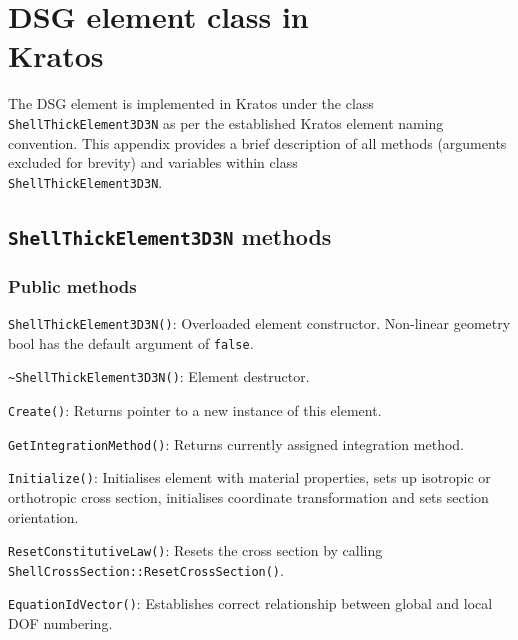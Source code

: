 
\chapter[DSG element class in Kratos]{DSG element class in \\ Kratos}
\label{app:DSG element as programmed in Kratos}
\renewcommand{\Thema}{DSG element class in Kratos}

The DSG element is implemented in Kratos under the class \texttt{ShellThickElement3D3N} as per the established Kratos element naming convention. This appendix provides a brief description of all methods (arguments excluded for brevity) and variables within class \\ \texttt{ShellThickElement3D3N}.

\section{\texttt{ShellThickElement3D3N} methods}
\subsection{Public methods}
\texttt{ShellThickElement3D3N()}: Overloaded element constructor. Non-linear geometry bool has the default argument of \texttt{false}.

\texttt{\textasciitilde ShellThickElement3D3N()}: Element destructor.

\texttt{Create()}: Returns pointer to a new instance of this element.

\texttt{GetIntegrationMethod()}: Returns currently assigned integration method.

\texttt{Initialize()}: Initialises element with material properties, sets up isotropic or orthotropic cross section, initialises coordinate transformation and sets section orientation.

\texttt{ResetConstitutiveLaw()}: Resets the cross section by calling \\ \texttt{ShellCrossSection::ResetCrossSection()}. 

\texttt{EquationIdVector()}: Establishes correct relationship between global and local DOF numbering.

